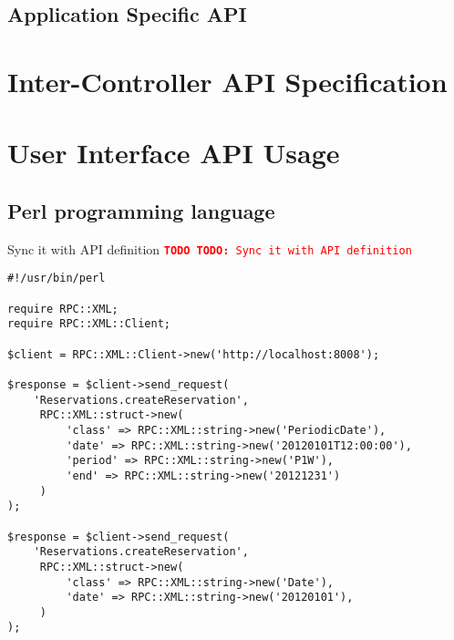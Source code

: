 \documentclass[a4paper]{report}
\newcommand{\TODO}[1]{%
\def\empty{}%
\def\prvniparametr{#1}%
\ifx\prvniparametr\empty%
\begingroup\tt\textcolor{red}{\noindent\textbf{TODO}}\endgroup
\else%
\begingroup\tt\textcolor{red}{\noindent\textbf{TODO:}\ #1}\endgroup
\fi%
}
\begin{document}
\section{Application Specific API}




\chapter{Inter-Controller API Specification}


\appendix
\chapter{User Interface API Usage}

\section{Perl programming language}

\TODO{Sync it with API definition}

\begin{verbatim}
#!/usr/bin/perl

require RPC::XML;
require RPC::XML::Client;

$client = RPC::XML::Client->new('http://localhost:8008');

$response = $client->send_request(
    'Reservations.createReservation',
     RPC::XML::struct->new(
         'class' => RPC::XML::string->new('PeriodicDate'),
         'date' => RPC::XML::string->new('20120101T12:00:00'),
         'period' => RPC::XML::string->new('P1W'),
         'end' => RPC::XML::string->new('20121231')
     )
);

$response = $client->send_request(
    'Reservations.createReservation',
     RPC::XML::struct->new(
         'class' => RPC::XML::string->new('Date'),
         'date' => RPC::XML::string->new('20120101'),
     )
);
\end{verbatim}




\end{document}
